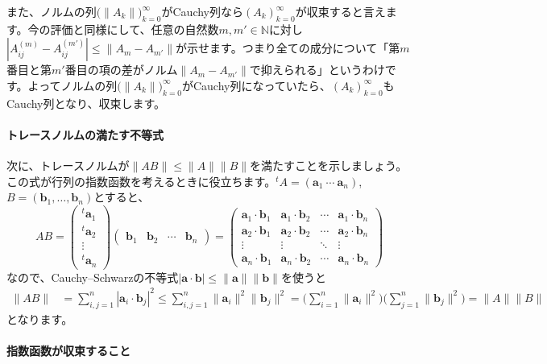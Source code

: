 また、ノルムの列$\bigl(\|A_k\|\bigr)_{k = 0}^{\infty}$がCauchy列なら$(A_k)_{k = 0}^{\infty}$が収束すると言えます。今の評価と同様にして、任意の自然数$m, m'\in\mathbb{N}$に対し$|A^{(m)}_{ij} - A^{(m')}_{ij}| \leq \|A_m - A_{m'}\|$が示せます。つまり全ての成分について「第$m$番目と第$m'$番目の項の差がノルム$\|A_m - A_{m'}\|$で抑えられる」というわけです。よってノルムの列$\bigl(\|A_k\|\bigr)_{k = 0}^{\infty}$がCauchy列になっていたら、$(A_k)_{k = 0}^{\infty}$もCauchy列となり、収束します。


\paragraph{トレースノルムの満たす不等式}

次に、トレースノルムが$\|AB\| \leq \|A\| \|B\|$を満たすことを示しましょう。この式が行列の指数函数を考えるときに役立ちます。${}^t\!A = (\bm{a}_1 \ \cdots \ \bm{a}_n)$, $B = (\bm{b}_1, \ldots, \bm{b}_n)$とすると、
\[
AB =
\begin{pmatrix}
{}^t\bm{a}_1 \\
{}^t\bm{a}_2 \\
\vdots \\
{}^t\bm{a}_n
\end{pmatrix}
\begin{pmatrix}
\bm{b}_1 & \bm{b}_2 & \cdots & \bm{b}_n
\end{pmatrix}
=
\begin{pmatrix}
\bm{a}_1 \cdot \bm{b}_1 & \bm{a}_1 \cdot \bm{b}_2 & \cdots & \bm{a}_1 \cdot \bm{b}_n \\
\bm{a}_2 \cdot \bm{b}_1 & \bm{a}_2 \cdot \bm{b}_2 & \cdots & \bm{a}_2 \cdot \bm{b}_n \\
\vdots & \vdots & \ddots & \vdots \\
\bm{a}_n \cdot \bm{b}_1 &  \bm{a}_n \cdot \bm{b}_2 & \cdots & \bm{a}_n \cdot \bm{b}_n
\end{pmatrix}
\]
なので、Cauchy--Schwarzの不等式$|\bm{a}\cdot\bm{b}| \leq \|\bm{a}\| \|\bm{b}\| $を使うと
\begin{align*}
\|AB\|
&= \sum_{i, j = 1}^n |\bm{a}_i \cdot \bm{b}_j|^2
\leq \sum_{i, j = 1}^n \|\bm{a}_i\|^2 \|\bm{b}_j\|^2
= \Biggl(\sum_{i = 1}^n \|\bm{a}_i\|^2 \Biggr) \Biggl( \sum_{j = 1}^n \|\bm{b}_j\|^2 \Biggr)
= \|A\| \|B\|
\end{align*}
となります。

\paragraph{指数函数が収束すること}


